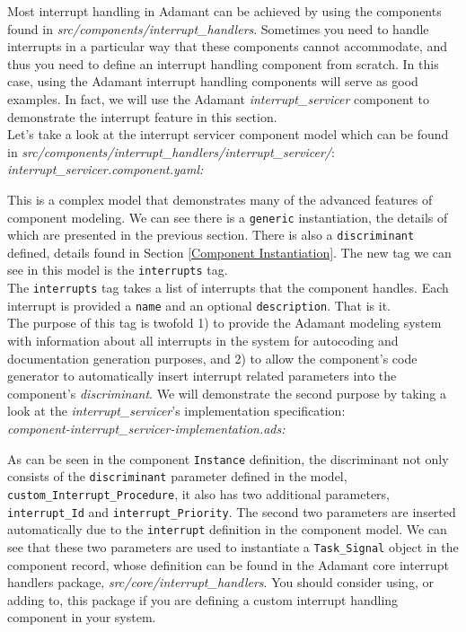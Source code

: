 Most interrupt handling in Adamant can be achieved by using the components found in \textit{src/components/interrupt\_handlers}. Sometimes you need to handle interrupts in a particular way that these components cannot accommodate, and thus you need to define an interrupt handling component from scratch. In this case, using the Adamant interrupt handling components will serve as good examples. In fact, we will use the Adamant \textit{interrupt\_servicer} component to demonstrate the interrupt feature in this section. \\

Let's take a look at the interrupt servicer component model which can be found in \textit{src/components/interrupt\_handlers/interrupt\_servicer/}: \\

\textit{interrupt\_servicer.component.yaml:} 

This is a complex model that demonstrates many of the advanced features of component modeling. We can see there is a \texttt{generic} instantiation, the details of which are presented in the previous section. There is also a \texttt{discriminant} defined, details found in Section \ref{Component Instantiation}. The new tag we can see in this model is the \texttt{interrupts} tag. \\

The \texttt{interrupts} tag takes a list of interrupts that the component handles. Each interrupt is provided a \texttt{name} and an optional \texttt{description}. That is it. \\

The purpose of this tag is twofold 1) to provide the Adamant modeling system with information about all interrupts in the system for autocoding and documentation generation purposes, and 2) to allow the component's code generator to automatically insert interrupt related parameters into the component's \textit{discriminant}. We will demonstrate the second purpose by taking a look at the \textit{interrupt\_servicer}'s implementation specification: \\

\textit{component-interrupt\_servicer-implementation.ads:} 

As can be seen in the component \texttt{Instance} definition, the discriminant not only consists of the \texttt{discriminant} parameter defined in the model, \texttt{custom\_Interrupt\_Procedure}, it also has two additional parameters, \texttt{interrupt\_Id} and \texttt{interrupt\_Priority}. The second two parameters are inserted automatically due to the \texttt{interrupt} definition in the component model. We can see that these two parameters are used to instantiate a \texttt{Task\_Signal} object in the component record, whose definition can be found in the Adamant core interrupt handlers package, \textit{src/core/interrupt\_handlers}. You should consider using, or adding to, this package if you are defining a custom interrupt handling component in your system. \\

